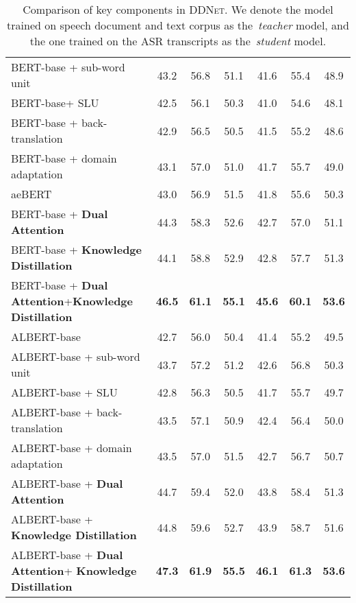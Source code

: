 \documentclass[11pt]{article}
\begin{document}
\begin{table*}[ht]
{\begin{tabular}{l|ccc|ccc}
    BERT-base + sub-word unit \cite{li2018spoken}&43.2&56.8&51.1&41.6&55.4&48.9\\
    BERT-base+ SLU \cite{serdyuk2018towards}&42.5&56.1&50.3&41.0&54.6&48.1\\
    BERT-base + back-translation \cite{lee2018odsqa}& 42.9&56.5&50.5&41.5&55.2&48.6\\
    BERT-base + domain adaptation \cite{lee2019mitigating}& 43.1&57.0&51.0&41.7&55.7&49.0\\
    aeBERT \cite{kuo2020audio}&43.0&56.9&51.5&41.8&55.6&50.3\\
    BERT-base + \textbf{Dual Attention}&44.3&58.3&52.6&42.7&57.0&51.1\\
    BERT-base + \textbf{Knowledge Distillation}&44.1& 58.8&52.9& 42.8& 57.7&51.3\\
    BERT-base + \textbf{Dual Attention}+\textbf{Knowledge Distillation}&\textbf{46.5}& \textbf{61.1}&\textbf{55.1}& \textbf{45.6}& \textbf{60.1}&\textbf{53.6}\\
    \midrule
    ALBERT-base \cite{lan2019albert}&42.7&56.0&50.4&41.4&55.2&49.5\\
    ALBERT-base + sub-word unit \cite{li2018spoken}&43.7&57.2&51.2&42.6&56.8&50.3\\
    ALBERT-base + SLU \cite{serdyuk2018towards}&42.8&56.3&50.5&41.7&55.7&49.7\\
    ALBERT-base + back-translation \cite{lee2018odsqa}& 43.5&57.1&50.9&42.4&56.4&50.0\\
    ALBERT-base + domain adaptation \cite{lee2019mitigating}& 43.5&57.0&51.5&42.7&56.7&50.7\\
    ALBERT-base + \textbf{Dual Attention}&44.7&59.4&52.0&43.8&58.4&51.3\\
    ALBERT-base + \textbf{Knowledge  Distillation}&44.8&59.6&52.7&43.9&58.7&51.6\\
    ALBERT-base + \textbf{Dual Attention}+ \textbf{Knowledge  Distillation}&\textbf{47.3}&\textbf{61.9}&\textbf{55.5}&\textbf{46.1}&\textbf{61.3}&\textbf{53.6}\\
    \bottomrule
    \end{tabular}
    }
     \caption{Comparison of key components in \textsc{DDNet}. We denote the model trained on speech document and text corpus as the~\textit{teacher} model, and the one trained on the ASR transcripts as the~\textit{student} model.}
    \label{tab:my_label_3}
    \vspace{-15pt}
\end{table*} 
\vspace{-0.5em}
\end{document}
